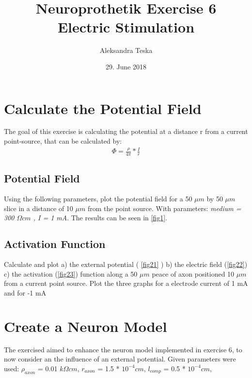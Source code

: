\documentclass{scrartcl}			%
\title{Neuroprothetik Exercise 6 \\\textsl{}
	Electric Stimulation}
\author{Aleksandra Teska}
\date{29. June 2018}
\begin{document}

\maketitle
\section{Calculate the Potential Field}
The goal of this exercise is calculating the potential at a distance r from a current point-source, that can be calculated by:
\begin{align}
\Phi = \frac{\rho}{4\pi} * \frac{I}{r}
\end{align}

\subsection{Potential Field}
Using the following parameters, plot the potential field for a 50 $\mu m$ by 50 $\mu m$ slice in a distance of 10 $\mu m$ from the point source. With parameters:\textit{ medium = 300 $\Omega cm$ , I = 1 mA}. The results can be seen in \ref{fig1}.

\subsection{Activation Function}
Calculate and plot 
a) the external potential ( \ref{fig21} )
b) the electric field (\ref{fig22})
c) the activation (\ref{fig23})
function along a 50 $\mu m$ peace of axon positioned 10 $\mu m$ from a current point source. Plot
the three graphs for a electrode current of 1 mA and for -1 mA


\section{Create a Neuron Model}
The exercised aimed to enhance the neuron model implemented in exercise 6, to now consider an the influence of an external potential. Given parameters were used: $\rho_{axon}$ = 0.01  $k \Omega cm$, $r_{axon}$ = 1.5 * $10^{ - 4} cm$,  $l_{comp}$ = 0.5 * $10^{ - 4} cm$, 
\end{document}
